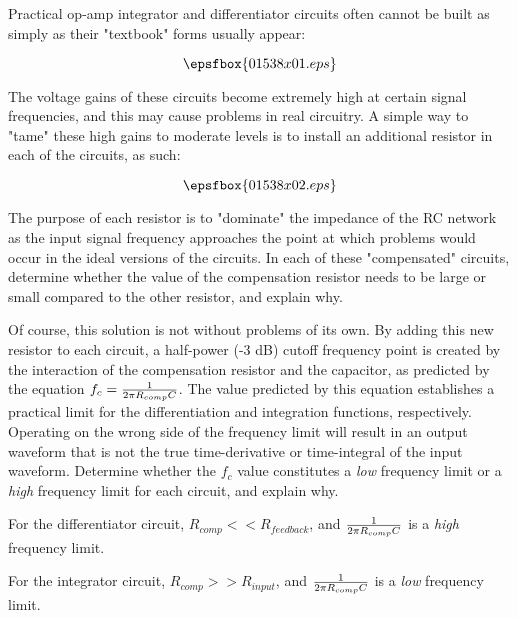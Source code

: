 

Practical op-amp integrator and differentiator circuits often cannot be built as simply as their "textbook" forms usually appear:

$$\epsfbox{01538x01.eps}$$

The voltage gains of these circuits become extremely high at certain signal frequencies, and this may cause problems in real circuitry.  A simple way to "tame" these high gains to moderate levels is to install an additional resistor in each of the circuits, as such:

$$\epsfbox{01538x02.eps}$$

The purpose of each resistor is to "dominate" the impedance of the RC network as the input signal frequency approaches the point at which problems would occur in the ideal versions of the circuits.  In each of these "compensated" circuits, determine whether the value of the compensation resistor needs to be large or small compared to the other resistor, and explain why.

Of course, this solution is not without problems of its own.  By adding this new resistor to each circuit, a half-power (-3 dB) cutoff frequency point is created by the interaction of the compensation resistor and the capacitor, as predicted by the equation $f_c = {1 \over {2 \pi R_{comp}C}}$.  The value predicted by this equation establishes a practical limit for the differentiation and integration functions, respectively.  Operating on the wrong side of the frequency limit will result in an output waveform that is not the true time-derivative or time-integral of the input waveform.  Determine whether the $f_c$ value constitutes a {\it low} frequency limit or a {\it high} frequency limit for each circuit, and explain why.







For the differentiator circuit, $R_{comp} << R_{feedback}$, and ${1 \over {2 \pi R_{comp}C}}$ is a {\it high} frequency limit.

\vskip 10pt

For the integrator circuit, $R_{comp} >> R_{input}$, and ${1 \over {2 \pi R_{comp}C}}$ is a {\it low} frequency limit.

